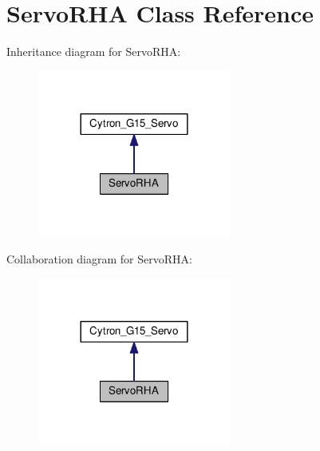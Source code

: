 \hypertarget{classServoRHA}{}\section{Servo\+R\+HA Class Reference}
\label{classServoRHA}


Inheritance diagram for Servo\+R\+HA\+:\nopagebreak
\begin{figure}[H]
\begin{center}
\leavevmode
\includegraphics[width=180pt]{classServoRHA__inherit__graph}
\end{center}
\end{figure}


Collaboration diagram for Servo\+R\+HA\+:\nopagebreak
\begin{figure}[H]
\begin{center}
\leavevmode
\includegraphics[width=180pt]{classServoRHA__coll__graph}
\end{center}
\end{figure}
